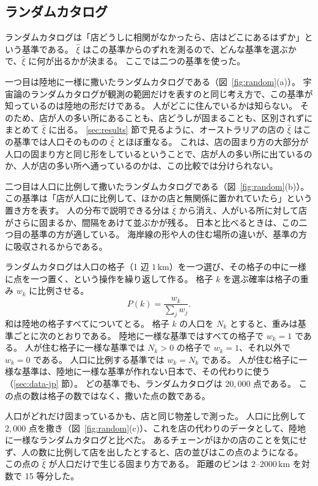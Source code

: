\documentclass[a4paper,11pt]{ltjsarticle}
\begin{document}
\subsection{ランダムカタログ}
\label{sec:random}


ランダムカタログは「店どうしに相関がなかったら、店はどこにあるはずか」という基準である。
$\hat\xi$ はこの基準からのずれを測るので、どんな基準を選ぶかで、$\hat\xi$ に何が出るかが決まる。
ここでは二つの基準を使った。

一つ目は陸地に一様に撒いたランダムカタログである（図~\ref{fig:random}(a)）。
宇宙論のランダムカタログが観測の範囲だけを表すのと同じ考え方で、この基準が知っているのは陸地の形だけである。
人がどこに住んでいるかは知らない。
そのため、店が人の多い所にあることも、店どうしが固まることも、区別されずにまとめて $\hat\xi$ に出る。
\ref{sec:results} 節で見るように、オーストラリアの店の $\hat\xi$ はこの基準では人口そのものの $\hat\xi$ とほぼ重なる。
これは、店の固まり方の大部分が人口の固まり方と同じ形をしているということで、店が人の多い所に出ているのか、人が店の多い所へ通っているのかは、この比較では分けられない。

二つ目は人口に比例して撒いたランダムカタログである（図~\ref{fig:random}(b)）。
この基準は「店が人口に比例して、ほかの店と無関係に置かれていたら」という置き方を表す。
人の分布で説明できる分は $\hat\xi$ から消え、人がいる所に対して店がさらに固まるか、間隔をあけて並ぶかが残る。
日本と比べるときは、この二つ目の基準の方が適している。
海岸線の形や人の住む場所の違いが、基準の方に吸収されるからである。

ランダムカタログは人口の格子（1 辺 $1\,\mathrm{km}$）を一つ選び、その格子の中に一様に点を一つ置く、という操作を繰り返して作る。
格子 $k$ を選ぶ確率は格子の重み $w_k$ に比例させる。
\begin{equation}
  P(k) = \frac{w_k}{\sum_j w_j}.
  \label{eq:random-weight}
\end{equation}
和は陸地の格子すべてについてとる。
格子 $k$ の人口を $N_k$ とすると、重みは基準ごとに次のとおりである。
陸地に一様な基準ではすべての格子で $w_k = 1$ である。
人が住む格子に一様な基準では $N_k > 0$ の格子で $w_k = 1$、それ以外で $w_k = 0$ である。
人口に比例する基準では $w_k = N_k$ である。
人が住む格子に一様な基準は、陸地に一様な基準が作れない日本で、その代わりに使う（\ref{sec:data-jp} 節）。
どの基準でも、ランダムカタログは $20{,}000$ 点である。
この点の数は格子の数ではなく、撒いた点の数である。

人口がどれだけ固まっているかも、店と同じ物差しで測った。
人口に比例して $2{,}000$ 点を撒き（図~\ref{fig:random}(c)）、これを店の代わりのデータとして、陸地に一様なランダムカタログと比べた。
あるチェーンがほかの店のことを気にせず、人の数に比例して店を出したとすると、店の並びはこの点のようになる。
この点の $\hat\xi$ が人口だけで生じる固まり方である。
距離のビンは $2$--$2000\,\mathrm{km}$ を対数で 15 等分した。
\end{document}
